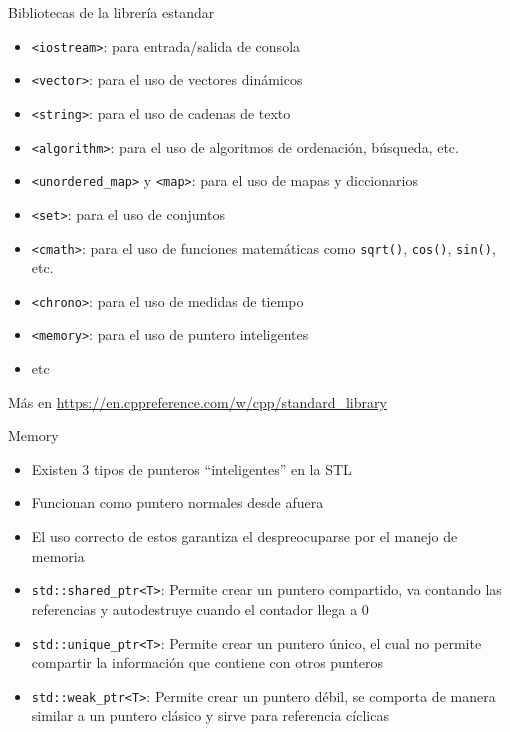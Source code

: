 \documentclass{beamer}
\begin{document}
\begin{frame}{Bibliotecas de la librería estandar}

\begin{itemize}
\item \texttt{<iostream>}: para entrada/salida de consola
\item \texttt{<vector>}: para el uso de vectores dinámicos
\item \texttt{<string>}: para el uso de cadenas de texto
\item \texttt{<algorithm>}: para el uso de algoritmos de ordenación, búsqueda, etc.
\item \texttt{<unordered\_map>} y \texttt{<map>}: para el uso de mapas y diccionarios
\item \texttt{<set>}: para el uso de conjuntos
\item \texttt{<cmath>}: para el uso de funciones matemáticas como \texttt{sqrt()}, \texttt{cos()}, \texttt{sin()}, etc.
\item \texttt{<chrono>}: para el uso de medidas de tiempo
\item \texttt{<memory>}: para el uso de puntero inteligentes
\item etc
\end{itemize}

Más en \url{https://en.cppreference.com/w/cpp/standard_library}

\end{frame}

\begin{frame}{Memory}

\begin{itemize}
\item Existen 3 tipos de punteros ``inteligentes'' en la STL
\item Funcionan como puntero normales desde afuera
\item El uso correcto de estos garantiza el despreocuparse por el manejo de memoria
\item \texttt{std::shared\_ptr<T>}: Permite crear un puntero compartido, va contando las referencias y autodestruye cuando el contador llega a 0
\item \texttt{std::unique\_ptr<T>}: Permite crear un puntero único, el cual no permite compartir la información que contiene con otros punteros
\item \texttt{std::weak\_ptr<T>}: Permite crear un puntero débil, se comporta de manera similar a un puntero clásico y sirve para referencia cíclicas
\end{itemize}

\end{frame}
\end{document}
